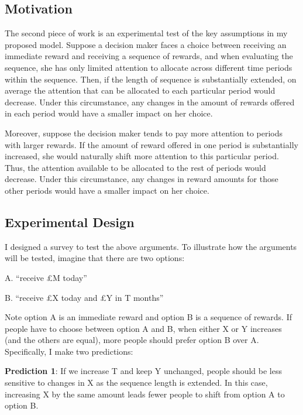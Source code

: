 \documentclass[
  12pt,
]{article}
\begin{document}
\hypertarget{motivation}{%
\subsection{Motivation}\label{motivation}}

The second piece of work is an experimental test of the key assumptions
in my proposed model. Suppose a decision maker faces a choice between
receiving an immediate reward and receiving a sequence of rewards, and
when evaluating the sequence, she has only limited attention to allocate
across different time periods within the sequence. Then, if the length
of sequence is substantially extended, on average the attention that can
be allocated to each particular period would decrease. Under this
circumstance, any changes in the amount of rewards offered in each
period would have a smaller impact on her choice.

Moreover, suppose the decision maker tends to pay more attention to
periods with larger rewards. If the amount of reward offered in one
period is substantially increased, she would naturally shift more
attention to this particular period. Thus, the attention available to be
allocated to the rest of periods would decrease. Under this
circumstance, any changes in reward amounts for those other periods
would have a smaller impact on her choice.

\hypertarget{experimental-design}{%
\subsection{Experimental Design}\label{experimental-design}}

I designed a survey to test the above arguments. To illustrate how the
arguments will be tested, imagine that there are two options:

\setlength{\leftskip}{1cm}

A. ``receive £M today''

B. ``receive £X today and £Y in T months''

\setlength{\leftskip}{0pt}

Note option A is an immediate reward and option B is a sequence of
rewards. If people have to choose between option A and B, when either X
or Y increases (and the others are equal), more people should prefer
option B over A. Specifically, I make two predictions:

\textbf{Prediction 1}: If we increase T and keep Y unchanged, people
should be less sensitive to changes in X as the sequence length is
extended. In this case, increasing X by the same amount leads fewer
people to shift from option A to option B.
\end{document}
